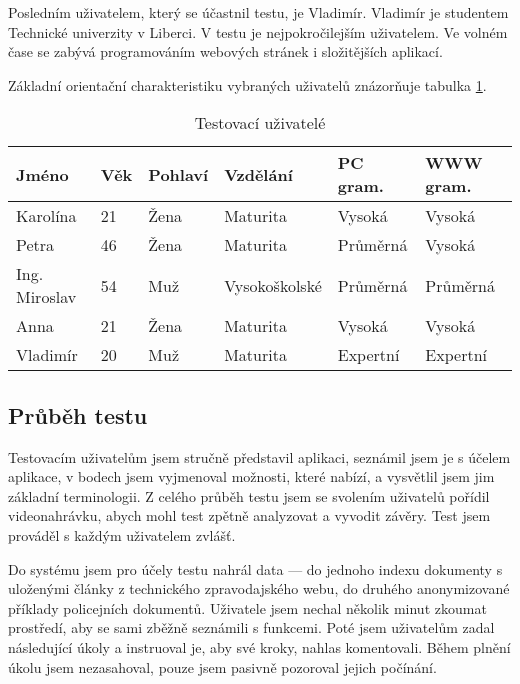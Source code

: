 Posledním uživatelem, který se účastnil testu, je Vladimír. Vladimír je studentem Technické univerzity v Liberci. V testu je nejpokročilejším uživatelem. Ve volném čase se zabývá programováním webových stránek i složitějších aplikací.

Základní orientační charakteristiku vybraných uživatelů znázorňuje tabulka \ref{tab:test_usrs}.

\begin{table}
\begin{center}
\begin{tabular}{|l|l|l|l|l|l|}
\hline
\textbf{Jméno} & \textbf{Věk} & \textbf{Pohlaví} & \textbf{Vzdělání} & \textbf{PC gram.} & \textbf{WWW gram.} \\ \hline
Karolína & 21 & Žena & Maturita & Vysoká & Vysoká \\ \hline
Petra & 46 & Žena & Maturita & Průměrná & Vysoká \\ \hline
Ing. Miroslav & 54 & Muž & Vysokoškolské & Průměrná & Průměrná \\ \hline
Anna & 21 & Žena & Maturita & Vysoká & Vysoká \\ \hline
Vladimír & 20 & Muž & Maturita & Expertní & Expertní \\ \hline
\end{tabular}
\end{center}
\caption{Testovací uživatelé}
\label{tab:test_usrs}
\end{table}

\subsection{Průběh testu}
Testovacím uživatelům jsem stručně představil aplikaci, seznámil jsem je s účelem aplikace, v bodech jsem vyjmenoval možnosti, které nabízí, a vysvětlil jsem jim základní terminologii. Z celého průběh testu jsem se svolením uživatelů pořídil videonahrávku, abych mohl test zpětně analyzovat a vyvodit závěry. Test jsem prováděl s každým uživatelem zvlášť.

Do systému jsem pro účely testu nahrál data --- do jednoho indexu dokumenty s uloženými články z technického zpravodajského webu, do druhého anonymizované příklady policejních dokumentů. Uživatele jsem nechal několik minut zkoumat prostředí, aby se sami zběžně seznámili s funkcemi. Poté jsem uživatelům zadal následující úkoly a instruoval je, aby své kroky, nahlas komentovali. Během plnění úkolu jsem nezasahoval, pouze jsem pasivně pozoroval jejich počínání.

